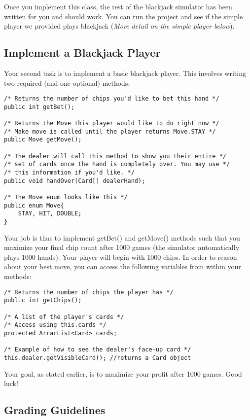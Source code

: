 \documentclass[paper=a4, fontsize=11pt, parskip=full]{scrartcl} %
\numberwithin{equation}{section} %
\numberwithin{figure}{section} %
\numberwithin{table}{section} %
\begin{document}
Once you implement this class, the rest of the blackjack simulator has been written for you and should work. You can run the project and see if the simple player we provided plays blackjack (\emph{More detail on the simple player below}).


\subsection{Implement a Blackjack Player}

Your second task is to implement a basic blackjack player. This involves writing two required (and one optional) methods:

\begin{lstlisting}
/* Returns the number of chips you'd like to bet this hand */
public int getBet();

/* Returns the Move this player would like to do right now */
/* Make move is called until the player returns Move.STAY */
public Move getMove();

/* The dealer will call this method to show you their entire */
/* set of cards once the hand is completely over. You may use */
/* this information if you'd like. */
public void handOver(Card[] dealerHand);

/* The Move enum looks like this */
public enum Move{
	STAY, HIT, DOUBLE;
}
\end{lstlisting}

Your job is thus to implement getBet() and getMove() methods such that you maximize your final chip count after 1000 games (the simulator automatically plays 1000 hands). Your player will begin with 1000 chips. In order to reason about your best move, you can access the following variables from within your methods:

\begin{lstlisting}
/* Returns the number of chips the player has */
public int getChips();

/* A list of the player's cards */
/* Access using this.cards */
protected ArrarList<Card> cards;

/* Example of how to see the dealer's face-up card */
this.dealer.getVisibleCard(); //returns a Card object
\end{lstlisting}

Your goal, as stated earlier, is to maximize your profit after 1000 games. Good luck!

\subsection{Grading Guidelines}
\end{document}
